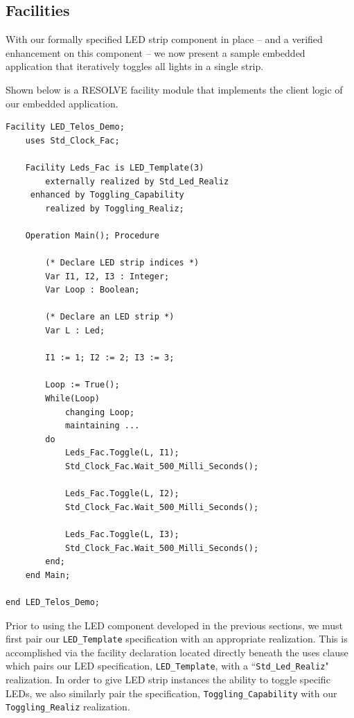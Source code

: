 \documentclass{sig-alternate}
\begin{document}
\subsection{Facilities}
\label{sec:facilities}

With our formally specified LED strip component in place -- and a verified enhancement on this component -- we now present a sample embedded application that iteratively toggles all lights in a single strip.

Shown below is a RESOLVE facility module that implements the client logic of our embedded application.
\begin{verbatim}
Facility LED_Telos_Demo;
    uses Std_Clock_Fac;
    
    Facility Leds_Fac is LED_Template(3)
        externally realized by Std_Led_Realiz
     enhanced by Toggling_Capability
        realized by Toggling_Realiz;
        
    Operation Main(); Procedure
    
        (* Declare LED strip indices *)
        Var I1, I2, I3 : Integer;
        Var Loop : Boolean;
        
        (* Declare an LED strip *)
        Var L : Led;
        
        I1 := 1; I2 := 2; I3 := 3;
        
        Loop := True();
        While(Loop)
            changing Loop;
            maintaining ...
        do
            Leds_Fac.Toggle(L, I1);
            Std_Clock_Fac.Wait_500_Milli_Seconds();
            
            Leds_Fac.Toggle(L, I2);
            Std_Clock_Fac.Wait_500_Milli_Seconds();
            
            Leds_Fac.Toggle(L, I3);
            Std_Clock_Fac.Wait_500_Milli_Seconds();
        end;
    end Main;
    
end LED_Telos_Demo;
\end{verbatim}

Prior to using the LED component developed in the previous sections, we must first pair our \texttt{LED\_Template} specification with an appropriate realization. This is accomplished via the facility declaration located directly beneath the uses clause which pairs our LED specification, \texttt{LED\_Template}, with a ``\texttt{Std\_Led\_Realiz}" realization. In order to give LED strip instances the ability to toggle specific LEDs, we also similarly pair the specification, \texttt{Toggling\_Capability} with our \texttt{Toggling\_Realiz} realization.
\end{document}
